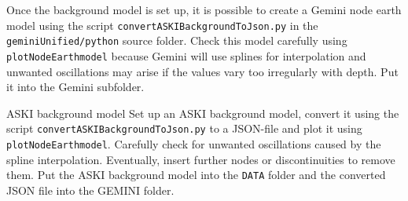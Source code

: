  Once the background model is set up, it is possible to create a Gemini node earth model using the script \verb+convertASKIBackgroundToJson.py+ in the \verb+geminiUnified/python+ source folder. Check this model carefully using \verb+plotNodeEarthmodel+ because Gemini will use splines for interpolation and unwanted oscillations may arise if the values vary too irregularly with depth. Put it into the Gemini subfolder.
%
\begin{actionbox}[label={action:aski-background},float=h!]{ASKI background model}
   Set up an ASKI background model, convert it using the script \verb+convertASKIBackgroundToJson.py+ to a JSON-file and plot it using \verb+plotNodeEarthmodel+. Carefully check for unwanted oscillations caused by the spline interpolation. Eventually, insert further nodes or discontinuities to remove them. Put the ASKI background model into the \verb+DATA+ folder and the converted JSON file into the GEMINI folder.
\end{actionbox}
%
